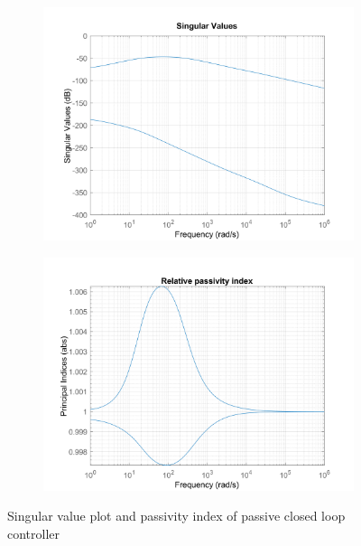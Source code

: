 \documentclass{article}
\begin{document}
\begin{figure}[H]
    \centering
    \begin{subfigure}{0.45\textwidth}
        \centering
        \includegraphics[width=\textwidth]{figures/K_p_sigma.png}
        \caption{}
        \label{fig:K_p_sigma}
    \end{subfigure}    
    \begin{subfigure}{0.45\textwidth}
        \centering
        \includegraphics[width=\textwidth]{figures/K_p_passive.png}
        \caption{}
        \label{fig:K_p_passive}
    \end{subfigure}
    \caption{Singular value plot and passivity index of passive closed loop controller}
\end{figure}
\end{document}
